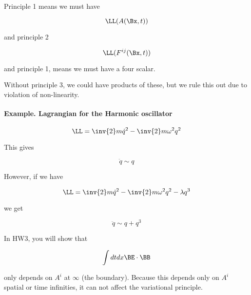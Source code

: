 Principle 1 means we must have 

\begin{equation}\label{eqn:relativisticElectrodynamicsL12:230}
\LL(A(\Bx, t))
\end{equation}

and principle 2

\begin{equation}\label{eqn:relativisticElectrodynamicsL12:250}
\LL(F^{ij}(\Bx, t))
\end{equation}

and principle 1, means we must have a four scalar.

Without principle 3, we could have products of these, but we rule this out due to violation of non-linearity.

\paragraph{Example.  Lagrangian for the Harmonic oscillator}

\begin{equation}\label{eqn:relativisticElectrodynamicsL12:270}
\LL = \inv{2} m \dot{q}^2 - \inv{2} m \omega^2 q^2 
\end{equation}

This gives 

\begin{equation}\label{eqn:relativisticElectrodynamicsL12:290}
\ddot{q} \sim q
\end{equation}

However, if we have

\begin{equation}\label{eqn:relativisticElectrodynamicsL12:310}
\LL = \inv{2} m \dot{q}^2 - \inv{2} m \omega^2 q^2 - \lambda q^3
\end{equation}

we get

\begin{equation}\label{eqn:relativisticElectrodynamicsL12:330}
\ddot{q} \sim q + q^3
\end{equation}

In HW3, you will show that 

\begin{equation}\label{eqn:relativisticElectrodynamicsL12:350}
\int dt dx \BE \cdot \BB
\end{equation}

only depends on $A^i$ at $\infty$ (the boundary).  Because this depends only on $A^i$ spatial or time infinities, it can not affect the variational principle.

